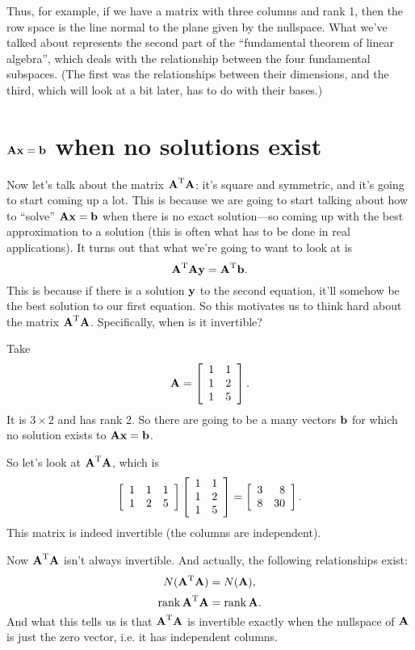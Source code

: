 Thus, for example, if we have a matrix with three columns and rank 1, then the row space is the line normal to the plane given by the nullspace.
\brm
What we've talked about represents the second part of the ``fundamental theorem of linear algebra'', which deals with the relationship between the four fundamental subspaces. (The first was the relationships between their dimensions, and the third, which will look at a bit later, has to do with their bases.)
\erm

\section{$\mA\vx = \vb$ when no solutions exist}

Now let's talk about the matrix $\T\mA \mA$: it's square and symmetric, and it's going to start coming up a lot. This is because we are going to start talking about how to ``solve'' $\mA \vx = \vb$ when there is no exact solution---so coming up with the best approximation to a solution (this is often what has to be done in real applications). It turns out that what we're going to want to look at is 
\[ \T \mA \mA \vy = \T\mA \vb. \]
This is because if there is a solution $\vy$ to the second equation, it'll somehow be the best solution to our first equation. So this motivates us to think hard about the matrix $\T\mA\mA$. Specifically, when is it invertible? 

\bex
Take 
\[ \mA = \mat{1&1\\1&2\\1&5}. \]
It is $3 \times 2$ and has rank 2. So there are going to be a many vectors $\vb$ for which no solution exists to $\mA \vx = \vb$.

So let's look at $\T\mA\mA$, which is
\[ \mat{1&1&1\\1&2&5}\mat{1&1\\1&2\\1&5} = \mat{3&8\\8&30}. \]
This matrix is indeed invertible (the columns are independent). 
\eex

Now $\T\mA\mA$ isn't always invertible. And actually, the following relationships exist:
\[ N(\T\mA\mA) = N(\mA), \]
\[ \Rank \T\mA\mA = \Rank \mA. \]
And what this tells us is that $\T\mA\mA$ is invertible exactly when the nullspace of $\mA$ is just the zero vector, i.e. it has independent columns.

